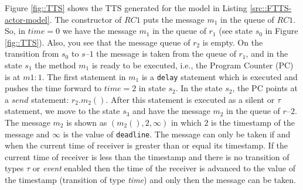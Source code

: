 Figure \ref{fig::TTS} shows the TTS generated for the model in Listing \ref{src::FTTS-actor-model}. 
The constructor of $RC1$ puts the message $m_1$ in the queue of $RC1$. So, in $time=0$ we have the message $m_1$ in the queue of $r_1$ (see state $s_0$ in Figure \ref{fig::TTS}). Also, you see that the message queue of $r_2$ is empty. On the transition from $s_0$ to $s–1$ the message is taken from the queue of $r_1$, and in the state $s_1$ the method $m_1$ is ready to be executed, i.e., the Program Counter (PC) is at $m1:1$. The first statement in $m_1$ is a \texttt{delay} statement which is executed and pushes the time forward to $time=2$ in state $s_2$.
In the state $s_2$, the PC points at a $send$ statement: $r_2.m_2()$. After this statement is executed as a silent or $\tau$ statement, we move to the state $s_3$ and have the message $m_2$ in the queue of $r–2$. The message $m_2$ is shown as $(m_2(), 2, \infty)$ in which $2$ is the timestamp of the message and $\infty$ is the value of \texttt{deadline}. The message can only be taken if and when the current time of receiver is greater than or equal its timestamp. If the current time of receiver is less than the timestamp and there is no transition of types  $\tau$  or \textit{event} enabled then the time of the receiver is advanced to the value of the timestamp (transition of type \textit{time}) and only then the message can be taken.

